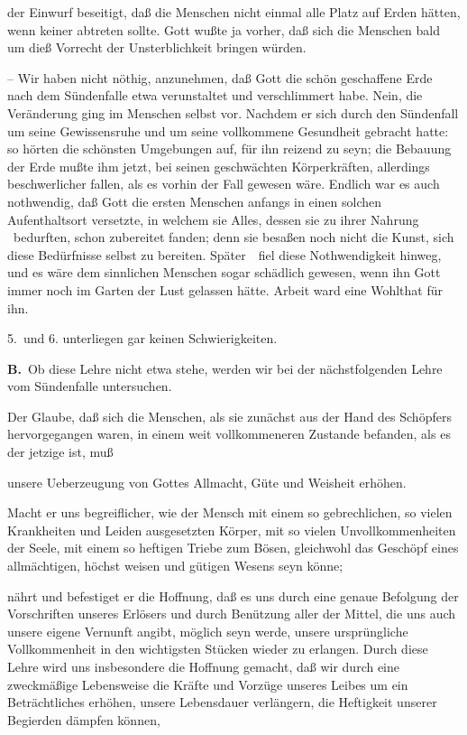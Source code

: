 \begin{aufza}
\begin{aufzb}
\item der Einwurf beseitigt, daß die Menschen nicht einmal alle Platz auf Erden hätten, wenn keiner abtreten sollte. Gott wußte ja vorher, daß sich die Menschen bald um dieß Vorrecht der Unsterblichkeit bringen würden.
\end{aufzb}
\item {} -- Wir haben nicht nöthig, anzunehmen, daß Gott die schön geschaffene Erde nach dem Sündenfalle etwa verunstaltet und verschlimmert habe. Nein, die Veränderung ging im Menschen selbst vor. Nachdem er sich durch den Sündenfall um seine Gewissensruhe und um seine vollkommene Gesundheit gebracht hatte: so hörten die schönsten Umgebungen auf, für ihn reizend zu seyn; die Bebauung der Erde mußte ihm jetzt, bei seinen geschwächten Körperkräften, allerdings beschwerlicher fallen, als es vorhin der Fall gewesen wäre. Endlich war es auch nothwendig, daß Gott die ersten Menschen anfangs in einen solchen Aufenthaltsort versetzte, in welchem sie Alles, dessen sie zu ihrer Nahrung \usw\ bedurften, schon zubereitet fanden; denn sie besaßen noch nicht die Kunst, sich diese Bedürfnisse selbst zu bereiten. Später~\ fiel diese Nothwendigkeit hinweg, und es wäre dem sinnlichen Menschen sogar schädlich gewesen, wenn ihn Gott immer noch im Garten der Lust gelassen hätte. Arbeit ward eine Wohlthat für ihn.
\item[5.\ und 6.] unterliegen gar keinen Schwierigkeiten.
\end{aufza}\par

\vabst \textbf{B.}~Ob diese Lehre nicht etwa  stehe, werden wir bei der nächstfolgenden Lehre vom Sündenfalle untersuchen.

Der Glaube, daß sich die Menschen, als sie zunächst aus der Hand des Schöpfers hervorgegangen waren, in einem weit vollkommeneren Zustande befanden, als es der jetzige ist, muß
\begin{aufza}
\item unsere Ueberzeugung von Gottes Allmacht, Güte und Weisheit erhöhen.
\item Macht er uns begreiflicher, wie der Mensch mit einem so gebrechlichen, so vielen Krankheiten und Leiden ausgesetzten Körper, mit so vielen Unvollkommenheiten der Seele, mit einem so heftigen Triebe zum Bösen, gleichwohl das Geschöpf eines allmächtigen, höchst weisen und gütigen Wesens seyn könne;
\item nährt und befestiget er die Hoffnung, daß es uns durch eine genaue Befolgung der Vorschriften unseres Erlösers und durch Benützung aller der Mittel, die uns auch unsere eigene Vernunft angibt, möglich seyn werde, unsere ursprüngliche Vollkommenheit in den wichtigsten Stücken wieder zu erlangen. Durch diese Lehre wird uns insbesondere die Hoffnung gemacht, daß wir durch eine zweckmäßige Lebensweise die Kräfte und Vorzüge unseres Leibes um ein Beträchtliches erhöhen, unsere Lebensdauer verlängern, die Heftigkeit unserer Begierden dämpfen können, \usw\
\end{aufza}


